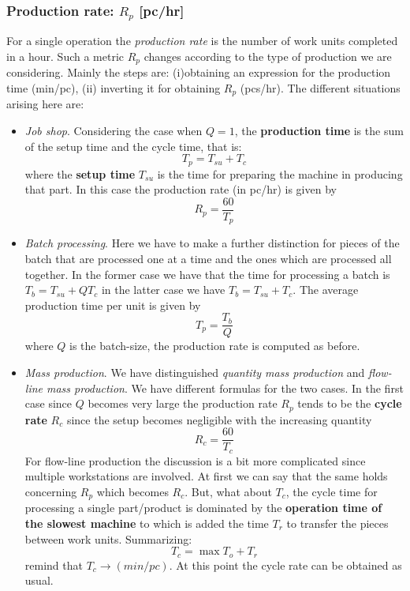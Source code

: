 \subsubsection{Production rate: $R_p$ [pc/hr]}
For a single operation the \textit{production rate} is the number of  work units completed in a hour. Such a metric $R_p$ changes according to the type of production we are considering. Mainly the steps are: (i)obtaining an expression for the production time (min/pc), (ii) inverting it for obtaining $R_p$ (pcs/hr). The different situations arising here are: 
\begin{itemize}
    \itemsep-0.3em
    \item \textit{Job shop}. Considering the case when $Q=1$, the \textbf{production time} is the sum of the setup time and the cycle time, that is: 
    \begin{equation}
        T_p=T_{su}+T_c
    \end{equation}
    where the \textbf{setup time} $T_{su}$ is the time for preparing the machine in producing that part.
    In this case the production rate (in pc/hr) is given by 
    \begin{equation*}
        R_p=\frac{60}{T_p}
    \end{equation*}
    \item \textit{Batch processing}. Here we have to make a further distinction for pieces of the batch that are processed one at a time and the ones which are processed all together. In the former case we have that the time for processing a batch is $T_b=T_{su}+Q{T_c}$ in the latter case we have $T_b=T_{su}+T_{c}$. The average production time per unit is given by 
    \begin{equation}
        T_p=\frac{T_b}{Q}
    \end{equation}
    where $Q$ is the batch-size, the production rate is computed as before.
    \item \textit{Mass production}. We have distinguished \textit{quantity mass production} and \textit{flow-line mass production}. We have different formulas for the two cases. In the first case since $Q$ becomes very large the production rate $R_p$ tends to be the \textbf{cycle rate} $R_c$ since the setup becomes negligible with the increasing quantity
    \begin{equation}
        R_c=\frac{60}{T_c}
    \end{equation}
    For flow-line production the discussion is a bit more complicated since multiple workstations are involved. At first we can say that the same holds concerning $R_p$ which becomes $R_c$. But, what about $T_c$, the cycle time for processing a single part/product is dominated by the \textbf{operation time of the slowest machine} to which is added the time $T_r$ to transfer the pieces between work units. Summarizing:
    \begin{equation}
        T_c= \max{T_o} + T_r
    \end{equation}
    remind that $T_c \to (min/pc)$. At this point the cycle rate can be obtained as usual.
\end{itemize}

